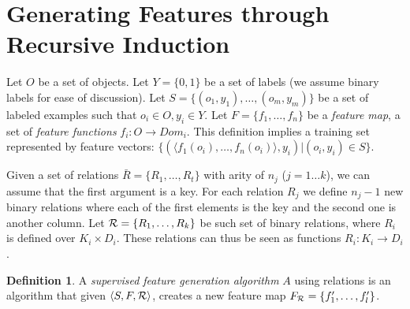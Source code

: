 \documentclass[twoside,11pt]{article}
\theoremstyle{definition}
\newtheorem{defn}{Definition}[section]
\begin{document}


\section{Generating Features through Recursive Induction}

Let $O$ be a set of objects. Let $Y=\{0,1\}$ be a set of labels (we assume binary labels for ease of discussion). Let $S=\{(o_{1},y_{1}),\ldots,(o_{m},y_{m})\}$ be a set of labeled examples such that $o_{i}\in O, y_{i}\in Y$. Let $F=\{f_{1},\ldots,f_{n}\}$ be a \emph{feature map}, a set of \emph{feature functions} $f_{i}:O\rightarrow Dom_{i}$.  This definition implies a training set represented by feature vectors: $\{ (\langle f_1(o_i),\ldots,f_n(o_i)\rangle, y_i) | (o_i,y_i) \in S\}$.

Given a set of relations $\bar{R}=\{R_{1},\ldots,R_{t}\}$ with arity of $n_{j}$ ($j=1\ldots k$), we can assume  that the first argument is a key. For each relation $R_{j}$ we define $n_{j}-1$ new binary relations where each of the first elements is the key and the second one is another column.
Let ${\cal R}=\{R_{1},\ldots,R_{k}\}$ be such set of binary relations, where $R_{i}$ is defined over $K_{i}\times D_{i}$. These relations can thus be seen as functions $R_{i}: K_{i}\rightarrow D_{i}$.

\begin{defn}
	A \emph{supervised feature generation algorithm} $A$ using relations is an algorithm that given $\langle S,F,{\cal R} \rangle$, creates a new feature map $F_{\cal R}=\{f'_{1},\ldots,f'_{l}\}$.
\end{defn}
\end{document}
